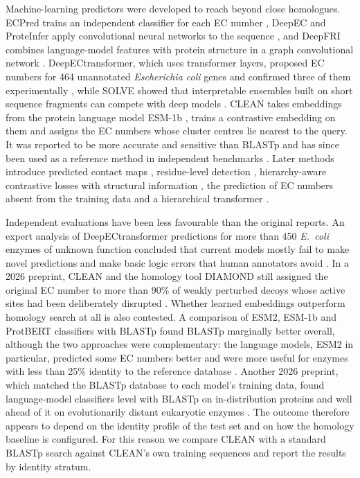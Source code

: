 Machine-learning predictors were developed to reach beyond close homologues. ECPred trains an independent classifier for each EC number \citep{Dalkiran2018}, DeepEC and ProteInfer apply convolutional neural networks to the sequence \citep{Ryu2019,Sanderson2023}, and DeepFRI combines language-model features with protein structure in a graph convolutional network \citep{Gligorijevic2021}. DeepECtransformer, which uses transformer layers, proposed EC numbers for 464 unannotated \textit{Escherichia coli} genes and confirmed three of them experimentally \citep{Kim2023}, while SOLVE showed that interpretable ensembles built on short sequence fragments can compete with deep models \citep{Dhibar2025}. CLEAN \citep{Yu2023} takes embeddings from the protein language model ESM-1b \citep{Rives2021}, trains a contrastive embedding on them and assigns the EC numbers whose cluster centres lie nearest to the query. It was reported to be more accurate and sensitive than BLASTp and has since been used as a reference method in independent benchmarks \citep{Davoudi2026,Sartori2026}. Later methods introduce predicted contact maps \citep[CLEAN-Contact;][]{YangY2024}, residue-level detection \citep[ProtDETR;][]{YangZ2025}, hierarchy-aware contrastive losses with structural information \citep[EnzymeHunter;][]{Cao2026}, the prediction of EC numbers absent from the training data \citep[EnzPlacer;][]{Ma2026} and a hierarchical transformer \citep[HIT-EC;][]{Dumontet2026}.

Independent evaluations have been less favourable than the original reports. An expert analysis of DeepECtransformer predictions for more than 450 \textit{E.~coli} enzymes of unknown function concluded that current models mostly fail to make novel predictions and make basic logic errors that human annotators avoid \citep{deCrecyLagard2025}. In a 2026 preprint, CLEAN and the homology tool DIAMOND still assigned the original EC number to more than 90\% of weakly perturbed decoys whose active sites had been deliberately disrupted \citep{Sartori2026}. Whether learned embeddings outperform homology search at all is also contested. A comparison of ESM2, ESM-1b and ProtBERT classifiers with BLASTp found BLASTp marginally better overall, although the two approaches were complementary: the language models, ESM2 in particular, predicted some EC numbers better and were more useful for enzymes with less than 25\% identity to the reference database \citep{Capela2025}. Another 2026 preprint, which matched the BLASTp database to each model's training data, found language-model classifiers level with BLASTp on in-distribution proteins and well ahead of it on evolutionarily distant eukaryotic enzymes \citep{Sathyamoorthy2026}. The outcome therefore appears to depend on the identity profile of the test set and on how the homology baseline is configured. For this reason we compare CLEAN with a standard BLASTp search against CLEAN's own training sequences and report the results by identity stratum.

